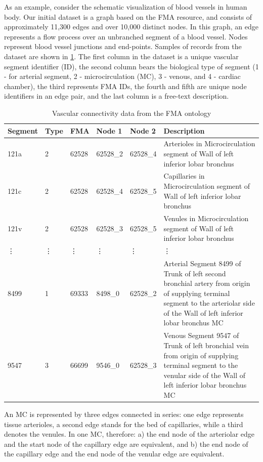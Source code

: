 As an example, consider the schematic visualization of blood vessels in human body. Our initial dataset is a graph based on the FMA resource, and consists of approximately 11,300 edges and over 10,000 distinct nodes. In this graph, an edge represents a flow process over an unbranched segment of a blood vessel. Nodes represent blood vessel junctions and end-points. Samples of records from the dataset are shown in \cref{tab:vascular-connectivity}. The first column in the dataset is a unique vascular segment identifier (ID), the second column bears the biological type of segment (1 - for arterial segment, 2 - microcirculation (MC), 3 - venous, and 4 - cardiac chamber), the third represents FMA IDs, the fourth and fifth are unique node identifiers in an edge pair, and the last column is a free-text description.

\begin{table}
	\def\vdt{\hskip1pt\vdots}
\begin{tabular}{l@{\ }l@{\ }l@{\ }l@{\ }l@{\ }|@{\ }p{6.2cm}}
  \textbf{Segment} & \textbf{Type} & \textbf{FMA} & \textbf{Node 1} & \textbf{Node 2} & \textbf{Description} \\
  \hline
  121a   & 2      & 62528  & 62528\_2 & 62528\_4  & Arterioles in Microcirculation segment of Wall of left inferior lobar bronchus \\[.5mm]
  121c   & 2      & 62528  & 62528\_4 & 62528\_5  & Capillaries in Microcirculation segment of Wall of left inferior lobar bronchus\\[.5mm]
  121v   & 2      & 62528  & 62528\_3 & 62528\_5  & Venules in Microcirculation segment of Wall of left inferior lobar bronchus\\[.5mm]
  \vdt & \vdt & \vdt & \vdt   & \vdt    & \vdt \\[.5mm]
  8499   & 1      & 69333  & 8498\_0  & 62528\_2  & Arterial Segment 8499 of Trunk
of left second bronchial artery from origin of supplying terminal segment
to the arteriolar side of the Wall of left inferior lobar bronchus MC\\[.5mm]
  9547 & 3 & 66699 & 9546\_0 & 62528\_3 & Venous Segment 9547 of Trunk of
left bronchial vein from origin of supplying terminal segment to the
venular side of the Wall of left inferior lobar bronchus MC
\end{tabular}\vskip2mm
\caption{Vascular connectivity data from the FMA ontology}
\label{tab:vascular-connectivity}
\end{table}

An MC is represented by three edges connected in series: one edge represents tissue arterioles, a second edge stands for the bed of
capillaries, while a third denotes the venules. In one MC, therefore: a) the end node of the arteriolar edge and the start node of the
capillary edge are equivalent, and b) the end node of the capillary edge and the end node of the venular edge are equivalent.

